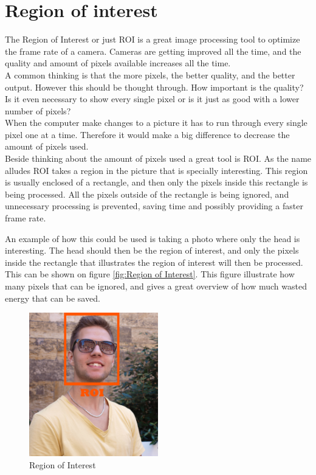 \section{Region of interest}
The Region of Interest or just ROI is a great image processing tool to optimize the frame rate of a camera. Cameras are getting improved all the time, and the quality and amount of pixels available increases all the time. \\
A common thinking is that the more pixels, the better quality, and the better output. However this should be thought through. How important is the quality? Is it even necessary to show every single pixel or is it just as good with a lower number of pixels?\\
When the computer make changes to a picture it has to run through every single pixel one at a time. Therefore it would make a big difference to decrease the amount of pixels used.\\
Beside thinking about the amount of pixels used a great tool is ROI. As the name alludes ROI takes a region in the picture that is specially interesting. This region is usually enclosed of a rectangle, and then only the pixels inside this rectangle is being processed. All the pixels outside of the rectangle is being ignored, and unnecessary processing is prevented, saving time and possibly providing a faster frame rate.

An example of how this could be used is taking a photo where only the head is interesting. The head should then be the region of interest, and only the pixels inside the rectangle that illustrates the region of interest will then be processed. This can be shown on figure \eqref{fig:Region of Interest}. This figure illustrate how many pixels that can be ignored, and gives a great overview of how much wasted energy that can be saved.


\begin{figure}[htbp] 
\centering 
\includegraphics[width=0.5\textwidth]{Pictures/Theory/RegionOfInterest.jpg} 
\caption{Region of Interest} 
\label{fig:Region of Interest} 
\end{figure} 

